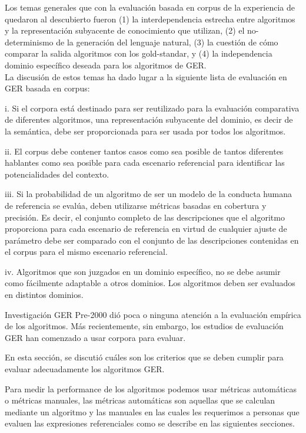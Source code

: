 %
Los temas generales que con la evaluaci\'on basada en corpus de la experiencia de \cite{viethen-phd} quedaron
al descubierto fueron (1) la interdependencia estrecha entre algoritmos y la
representaci\'on subyacente de conocimiento que utilizan, (2) el no-determinismo de la generaci\'on del lenguaje natural, 
(3) la cuesti\'on de c\'omo comparar la salida algoritmos con los gold-standar, y (4) la independencia dominio espec\'ifico deseada para los algoritmos de GER.\\
La discusi\'on de estos temas ha dado lugar a la siguiente lista de evaluaci\'on en GER basada en corpus:

i. Si el corpora est\'a destinado para ser reutilizado para la evaluaci\'on comparativa de diferentes
algoritmos, una representaci\'on subyacente del dominio, es decir de la sem\'antica, debe ser proporcionada para ser usada por todos los algoritmos.

ii. El corpus debe contener tantos casos como sea posible de tantos diferentes hablantes como sea posible para cada escenario referencial para identificar las potencialidades del contexto. 

iii. Si la probabilidad de un algoritmo de ser un modelo de la conducta humana de referencia
se eval\'ua, deben utilizarse m\'etricas basadas en cobertura y precisi\'on. Es decir, el conjunto completo de las descripciones que el algoritmo proporciona para cada
escenario de referencia en virtud de cualquier ajuste de par\'ametro debe ser comparado con el
conjunto de las descripciones contenidas en el corpus para el mismo escenario referencial.

iv. Algoritmos que son juzgados en un dominio espec\'ifico, no se debe asumir como
f\'acilmente adaptable a otros dominios. Los algoritmos deben ser evaluados en distintos dominios.

Investigaci\'on GER Pre-2000 di\'o poca o ninguna atenci\'on a la evaluaci\'on emp\'irica de los algoritmos. M\'as 
recientemente, sin embargo, los estudios de evaluaci\'on GER han comenzado a usar corpora para evaluar.

En esta secci\'on, se discuti\'o cu\'ales son los criterios que se deben cumplir
para evaluar adecuadamente los algoritmos GER.

Para medir la performance de los algoritmos podemos usar m\'etricas autom\'aticas o m\'etricas manuales, las m\'etricas autom\'aticas son aquellas que se calculan mediante un algoritmo y las manuales en las cuales les requerimos a personas que evaluen las expresiones referenciales como se describe en las siguientes secciones.


